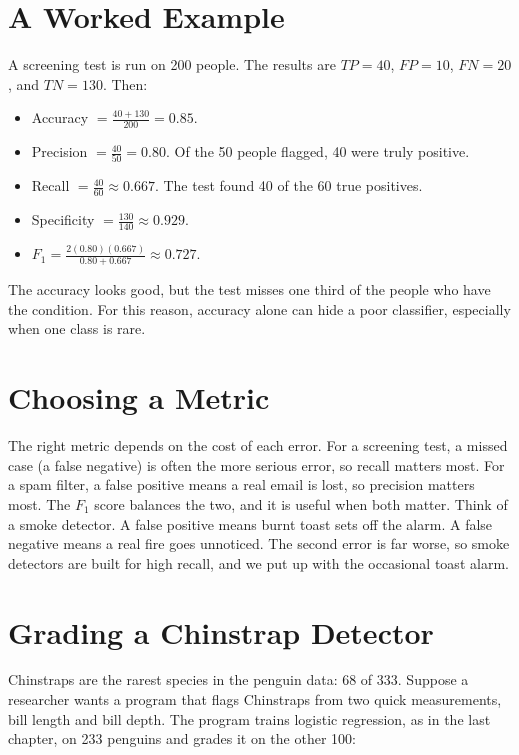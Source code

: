 \section{A Worked Example}
A screening test is run on 200 people. The results are $TP = 40$, $FP = 10$,
$FN = 20$, and $TN = 130$. Then:
\begin{itemize}
\item Accuracy $= \frac{40 + 130}{200} = 0.85$.
\item Precision $= \frac{40}{50} = 0.80$. Of the 50 people flagged, 40 were truly positive.
\item Recall $= \frac{40}{60} \approx 0.667$. The test found 40 of the 60 true positives.
\item Specificity $= \frac{130}{140} \approx 0.929$.
\item $F_1 = \frac{2(0.80)(0.667)}{0.80 + 0.667} \approx 0.727$.
\end{itemize}
The accuracy looks good, but the test misses one third of the people who have the condition.
For this reason, accuracy alone can hide a poor classifier, especially when one class is rare.

\section{Choosing a Metric}
The right metric depends on the cost of each error. For a screening test, a missed case
(a false negative) is often the more serious error, so recall matters most. For a spam
filter, a false positive means a real email is lost, so precision matters most. The
$F_1$ score balances the two, and it is useful when both matter. Think of a smoke detector. A false positive means burnt toast sets off the alarm.
A false negative means a real fire goes unnoticed. The second error is far worse,
so smoke detectors are built for high recall, and we put up with the occasional
toast alarm.

\section{Grading a Chinstrap Detector}
Chinstraps are the rarest species in the penguin data: 68 of 333. Suppose a researcher wants a program that flags
Chinstraps from two quick measurements, bill length and bill depth. The program  trains
logistic regression, as in the last chapter, on 233 penguins and grades it on the other 100:

